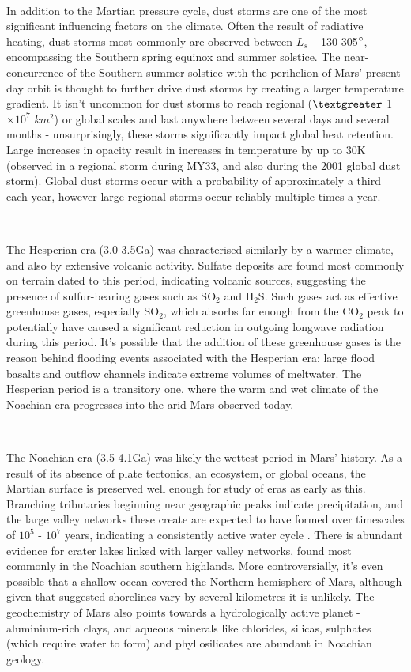 \documentclass[12pt,onecolumn]{revtex4-2}    %
\begin{document}
\

In addition to the Martian pressure cycle, dust storms are one of the most significant influencing factors on the climate. Often the result of radiative heating, dust storms most commonly are observed between $L_{s}$ ~ 130-305$\degree$, encompassing the Southern spring equinox and summer solstice. The near-concurrence of the Southern summer solstice with the perihelion of Mars' present-day orbit is thought to further drive dust storms by creating a larger temperature gradient. It isn't uncommon for dust storms to reach regional ($\textgreater$ 1$\times 10^{7}$ $km^{2}$) or global scales and last anywhere between several days and several months - unsurprisingly, these storms significantly impact global heat retention. Large increases in opacity result in increases in temperature by up to 30K (observed in a regional storm during MY33, and also during the 2001 global dust storm). Global dust storms occur with a probability of approximately a third each year, however large regional storms occur reliably multiple times a year.

\

The Hesperian era (3.0-3.5Ga) was characterised similarly by a warmer climate, and also by extensive volcanic activity. Sulfate deposits are found most commonly on terrain dated to this period, indicating volcanic sources, suggesting the presence of sulfur-bearing gases such as $\mathrm{SO_2}$ and $\mathrm{H_2 S}$. Such gases act as effective greenhouse gases, especially $\mathrm{SO_2}$, which absorbs far enough from the $\mathrm{CO_2}$ peak to potentially have caused a significant reduction in outgoing longwave radiation during this period. It's possible that the addition of these greenhouse gases is the reason behind flooding events associated with the Hesperian era: large flood basalts and outflow channels indicate extreme volumes of meltwater. The Hesperian period is a transitory one, where the warm and wet climate of the Noachian era progresses into the arid Mars observed today.

\

The Noachian era (3.5-4.1Ga) was likely the wettest period in Mars' history. As a result of its absence of plate tectonics, an ecosystem, or global oceans, the Martian surface is preserved well enough for study of eras as early as this. Branching tributaries beginning near geographic peaks indicate precipitation, and the large valley networks these create are expected to have formed over timescales of $10^{5}$ - $10^{7}$ years, indicating a consistently active water cycle \cite{W16}. There is abundant evidence for crater lakes linked with larger valley networks, found most commonly in the Noachian southern highlands. More controversially, it's even possible that a shallow ocean covered the Northern hemisphere of Mars, although given that suggested shorelines vary by several kilometres it is unlikely. The geochemistry of Mars also points towards a hydrologically active planet - aluminium-rich clays, and aqueous minerals like chlorides, silicas, sulphates (which require water to form) and phyllosilicates are abundant in Noachian geology. 
\end{document}

